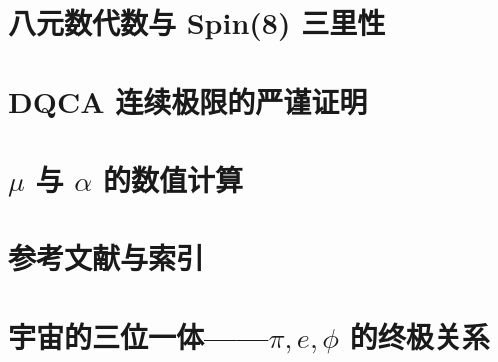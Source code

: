 \documentclass[11pt,a4paper,twoside]{book}
\begin{document}
\appendix

\chapter{八元数代数与 Spin(8) 三里性}


\chapter{DQCA 连续极限的严谨证明}


\chapter{\texorpdfstring{$\mu$ 与 $\alpha$ 的数值计算}{mu 与 alpha 的数值计算}}


\chapter{参考文献与索引}


\chapter{\texorpdfstring{宇宙的三位一体——$\pi, e, \phi$ 的终极关系}{宇宙的三位一体——pi, e, phi 的终极关系}}


\backmatter


\end{document}
